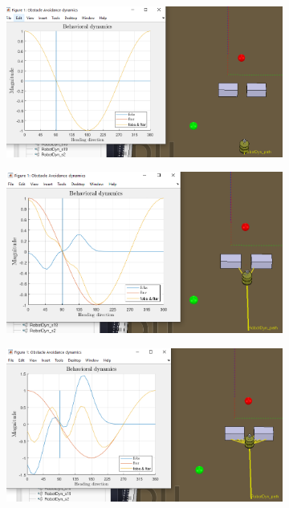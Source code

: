 \begin{figure}[htb!]
  \centering
%
  \begin{subfigure}{.45\textwidth}
  \includegraphics[width=\textwidth]{img/3-3-1.PNG}%
  \caption{}%
  \label{fig:obs-tar-nonlinear-behavioral-50-1}
  \end{subfigure}
%
  \begin{subfigure}{.45\textwidth}
    \includegraphics[width=\textwidth]{img/3-3-2.PNG}%
  \caption{}%
  \label{fig:obs-tar-nonlinear-behavioral-50-2}
  \end{subfigure}
%
  \begin{subfigure}{.45\textwidth}
    \includegraphics[width=\textwidth]{img/3-3-3.PNG}%

\end{subfigure}
\end{figure}
